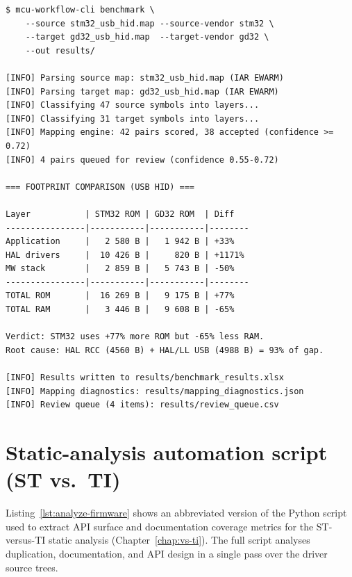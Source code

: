 \begin{lstlisting}[language={}, caption={MCU Workflow Studio CLI --- benchmark summary output.}, label={lst:tool-output}]
$ mcu-workflow-cli benchmark \
    --source stm32_usb_hid.map --source-vendor stm32 \
    --target gd32_usb_hid.map  --target-vendor gd32 \
    --out results/

[INFO] Parsing source map: stm32_usb_hid.map (IAR EWARM)
[INFO] Parsing target map: gd32_usb_hid.map (IAR EWARM)
[INFO] Classifying 47 source symbols into layers...
[INFO] Classifying 31 target symbols into layers...
[INFO] Mapping engine: 42 pairs scored, 38 accepted (confidence >= 0.72)
[INFO] 4 pairs queued for review (confidence 0.55-0.72)

=== FOOTPRINT COMPARISON (USB HID) ===

Layer           | STM32 ROM | GD32 ROM  | Diff
----------------|-----------|-----------|--------
Application     |   2 580 B |   1 942 B | +33%
HAL drivers     |  10 426 B |     820 B | +1171%
MW stack        |   2 859 B |   5 743 B | -50%
----------------|-----------|-----------|--------
TOTAL ROM       |  16 269 B |   9 175 B | +77%
TOTAL RAM       |   3 446 B |   9 608 B | -65%

Verdict: STM32 uses +77% more ROM but -65% less RAM.
Root cause: HAL RCC (4560 B) + HAL/LL USB (4988 B) = 93% of gap.

[INFO] Results written to results/benchmark_results.xlsx
[INFO] Mapping diagnostics: results/mapping_diagnostics.json
[INFO] Review queue (4 items): results/review_queue.csv
\end{lstlisting}

\pagebreak

\section{Static-analysis automation script (ST vs.\ TI)}
\label{sec:appendix-analyze-firmware}

Listing~\ref{lst:analyze-firmware} shows an abbreviated version of the Python script used
to extract API surface and documentation coverage metrics for the ST-versus-TI static
analysis (Chapter~\ref{chap:vs-ti}). The full script analyses duplication, documentation,
and API design in a single pass over the driver source trees.

